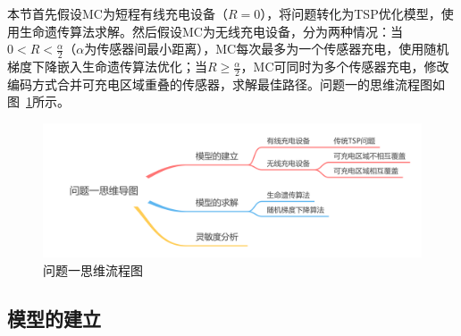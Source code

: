 \documentclass{whutmod}
\begin{document}
            本节首先假设MC为短程有线充电设备（$R=0$），将问题转化为TSP优化模型，使用生命遗传算法求解。然后假设MC为无线充电设备，分为两种情况：当$0<R<\frac{\alpha}{2}$（$\alpha$为传感器间最小距离），MC每次最多为一个传感器充电，使用随机梯度下降嵌入生命遗传算法优化；当$R \geqslant \frac{\alpha}{2}$，MC可同时为多个传感器充电，修改编码方式合并可充电区域重叠的传感器，求解最佳路径。问题一的思维流程图如图~\ref{asdf}所示。

            \begin{figure}[H]
                \centering
                \includegraphics[width=\textwidth]{figures/1.png}
                \caption{问题一思维流程图}\label{asdf}
            \end{figure}

        \subsection{模型的建立}
\end{document}
